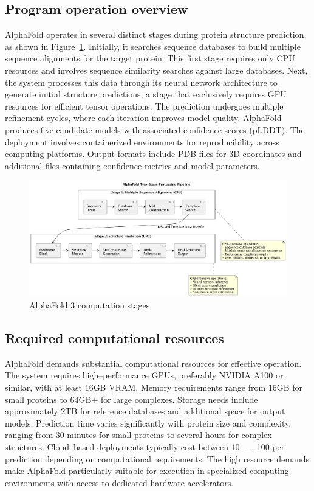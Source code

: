 \subsection{Program operation overview}

AlphaFold operates in several distinct stages during protein structure prediction, as shown in Figure~\ref{fig:alphafold}.
Initially, it searches sequence databases to build multiple sequence alignments for the target protein.
This first stage requires only CPU resources and involves sequence similarity searches against large databases.
Next, the system processes this data through its neural network architecture to generate initial structure predictions, a stage that exclusively requires GPU resources for efficient tensor operations.
The prediction undergoes multiple refinement cycles, where each iteration improves model quality.
AlphaFold produces five candidate models with associated confidence scores (pLDDT). The deployment involves containerized environments for reproducibility across computing platforms.
Output formats include PDB files for 3D coordinates and additional files containing confidence metrics and model parameters.

\begin{figure}[htbp]
    \centering
    \includegraphics[width=\textwidth]{images/alphafold}
    \caption{AlphaFold 3 computation stages}
    \label{fig:alphafold}
\end{figure}

\subsection{Required computational resources}

AlphaFold demands substantial computational resources for effective operation.
The system requires high--performance GPUs, preferably NVIDIA A100 or similar, with at least 16GB VRAM. Memory requirements range from 16GB for small proteins to 64GB+ for large complexes.
Storage needs include approximately 2TB for reference databases and additional space for output models.
Prediction time varies significantly with protein size and complexity, ranging from 30 minutes for small proteins to several hours for complex structures.
Cloud--based deployments typically cost between $10--$100 per prediction depending on computational requirements.
The high resource demands make AlphaFold particularly suitable for execution in specialized computing environments with access to dedicated hardware accelerators.


